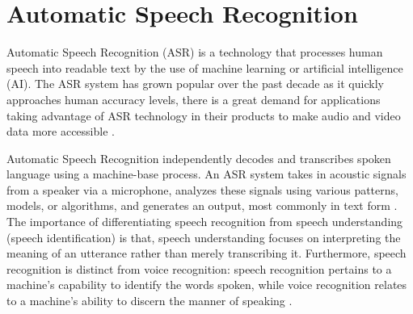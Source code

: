\begin{comment}
2.  Find references using these keywords

3.  For each of the references that you find,
        Check: Is it relevant to your research?
        Use their references to find more relevant works.

4. Identify a set of criteria for comparison.
       It will serve as a guide to help you focus on what to look for

5. Write a summary focusing on -
       What: A short description of the work
       How: A summary of the approach it utilized
       Findings: If applicable, provide the results
        Why: Relevance to your work

6. At the end of each section,  show a Table of Comparison of the related works 
   and your proposed project/system

\end{comment}

\section{Automatic Speech Recognition}
\label{sec:ASR}

Automatic Speech Recognition (ASR) is a technology that processes human speech into readable text by the use of machine learning or artificial intelligence (AI). The ASR system has grown popular over the past decade as it quickly approaches human accuracy levels, there is a great demand for applications taking advantage of ASR technology in their products to make audio and video data more accessible .

Automatic Speech Recognition independently decodes and transcribes spoken language using a machine-base process. An ASR system takes in acoustic signals from a speaker via a microphone, analyzes these signals using various patterns, models, or algorithms, and generates an output, most commonly in text form . The importance of differentiating speech recognition from speech understanding (speech identification) is that, speech understanding focuses on interpreting the meaning of an utterance rather than merely transcribing it. Furthermore, speech recognition is distinct from voice recognition: speech recognition pertains to a machine's capability to identify the words spoken, while voice recognition relates to a machine's ability to discern the manner of speaking .

